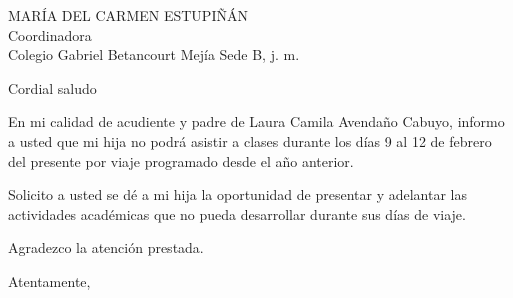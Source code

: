 \documentclass[letterpaper,spanish]{letter}
\date{5 de febrero de 2016}
\begin{document}
\begin{letter}{MARÍA DEL CARMEN ESTUPIÑÁN\\Coordinadora\\Colegio Gabriel Betancourt Mejía Sede B, j. m.}
	
\opening{Cordial saludo}
En mi calidad de acudiente y padre de Laura Camila Avendaño Cabuyo, informo a usted que mi hija no podrá asistir a clases durante los días 9 al 12 de febrero del presente por viaje programado desde el año anterior.

Solicito a usted se dé a mi hija la oportunidad de presentar y adelantar las actividades académicas que no pueda desarrollar durante sus días de viaje.

Agradezco la atención prestada.
\closing{Atentamente,}


\end{letter}
\end{document}
